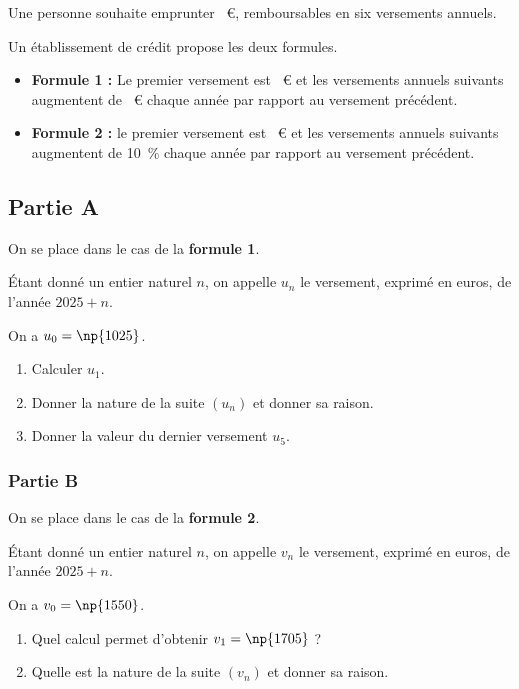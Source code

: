 Une personne souhaite emprunter ~\euro{}, remboursables en six versements annuels.

Un établissement de crédit propose les deux formules.

\begin{itemize}[label={\textbullet}]
\item \textbf{Formule 1 :} Le premier versement est ~\euro{} et les versements annuels suivants augmentent de ~\euro{} chaque année par rapport au versement précédent.
\item \textbf{Formule 2 :} le premier versement est ~\euro{} et les versements annuels suivants augmentent de 10~\% chaque année par rapport au versement précédent.
\end{itemize}

\subsection*{Partie A}

On se place dans le cas de la \textbf{formule 1}.

Étant donné un entier naturel $n$, on appelle $u_n$ le versement, exprimé en euros, de l'année $2025+n$.

On a \quad $u_0=\np{1025}$.

\begin{enumerate}
\item Calculer $u_1$.
\item Donner la nature de la suite $(u_n)$ et donner sa raison.
\item Donner la valeur du dernier versement $u_5$.
\end{enumerate}

\subsubsection*{Partie B}

On se place dans le cas de la \textbf{formule 2}.

Étant donné un entier naturel $n$, on appelle $v_n$ le versement, exprimé en euros, de l'année $2025+n$.

On a \quad $v_0=\np{1550}$.

\begin{enumerate}
\item Quel calcul permet d'obtenir $v_1=\np{1705}$ ?
\item Quelle est la nature de la suite $(v_n)$ et donner sa raison.
\end{enumerate}

